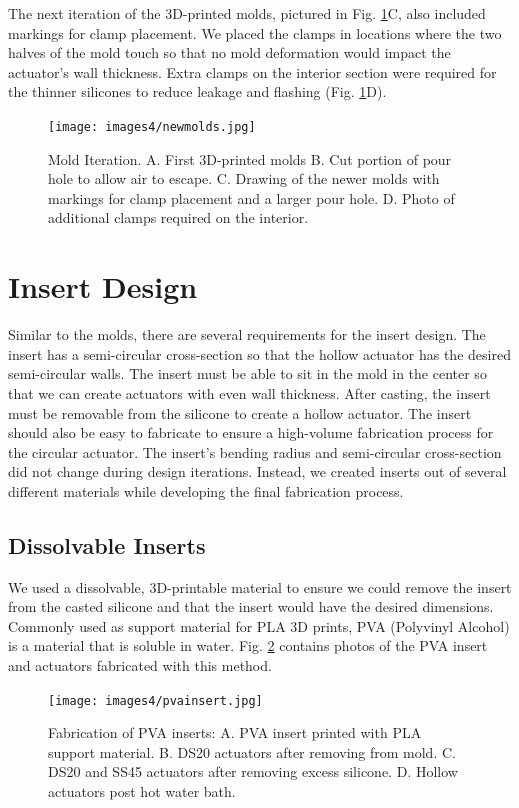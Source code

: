 The next iteration of the 3D-printed molds, pictured in Fig. \ref{fig:newmolds}C, also included markings for clamp placement. We placed the clamps in locations where the two halves of the mold touch so that no mold deformation would impact the actuator's wall thickness. Extra clamps on the interior section were required for the thinner silicones to reduce leakage and flashing (Fig. \ref{fig:newmolds}D). 

\begin{figure}[ht]
    \centering
    \texttt{[image: images4/newmolds.jpg]}
    \caption{Mold Iteration. A. First 3D-printed molds B. Cut portion of pour hole to allow air to escape. C. Drawing of the newer molds with markings for clamp placement and a larger pour hole. D. Photo of additional clamps required on the interior.}
    \label{fig:newmolds}
\end{figure}

\section{Insert Design}

Similar to the molds, there are several requirements for the insert design. The insert has a semi-circular cross-section so that the hollow actuator has the desired semi-circular walls. The insert must be able to sit in the mold in the center so that we can create actuators with even wall thickness. After casting, the insert must be removable from the silicone to create a hollow actuator. The insert should also be easy to fabricate to ensure a high-volume fabrication process for the circular actuator. The insert's bending radius and semi-circular cross-section did not change during design iterations. Instead, we created inserts out of several different materials while developing the final fabrication process. 

\subsection{Dissolvable Inserts}

We used a dissolvable, 3D-printable material to ensure we could remove the insert from the casted silicone and that the insert would have the desired dimensions. Commonly used as support material for PLA 3D prints, PVA (Polyvinyl Alcohol) is a material that is soluble in water. Fig. \ref{fig:pvainsert} contains photos of the PVA insert and actuators fabricated with this method. 

\begin{figure}[!ht]
    \centering
    \texttt{[image: images4/pvainsert.jpg]}
    \caption{Fabrication of PVA inserts: A. PVA insert printed with PLA support material. B. DS20 actuators after removing from mold. C. DS20 and SS45 actuators after removing excess silicone. D. Hollow actuators post hot water bath.}
    \label{fig:pvainsert}
\end{figure}

